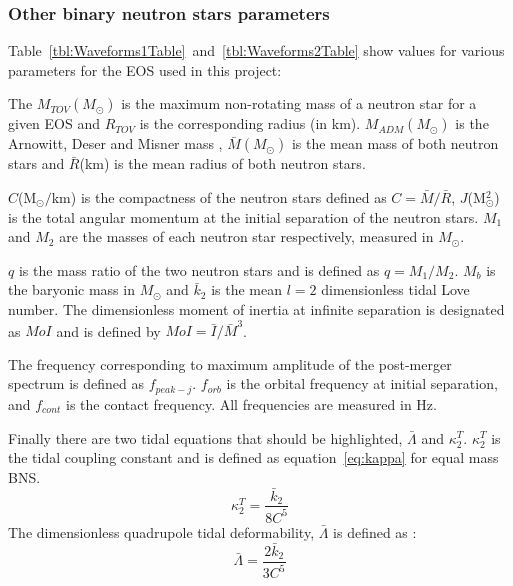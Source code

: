 \subsubsection{Other binary neutron stars parameters}
Table~\ref{tbl:Waveforms1Table}~and~\ref{tbl:Waveforms2Table} show values for various parameters for the EOS used in this project:
\begin{table}[H]
	\centering
	\resizebox{0.91\textwidth}{!}{%
		 }%
	\caption[\protect]{\protect}
	\label{tbl:Waveforms1Table}
\end{table}
\begin{table}[H]
	\centering	
	\resizebox{\textwidth}{!}{%
		 }%
	\caption[\protect]{\protect}
	\label{tbl:Waveforms2Table}
\end{table}
The $M_{TOV}(M_\odot)$ is the maximum non-rotating mass of a neutron star for a given EOS and $R_{TOV}$ is the corresponding radius (in km). $M_{ADM}(M_\odot)$ is the Arnowitt, Deser and Misner mass \citep{Arnowitt1959}, $\bar{M}(M_\odot)$ is the mean mass of both neutron stars and $\bar{R}$(km) is the mean radius of both neutron stars.\par 
$C$(M$_\odot/$km) is the compactness of the neutron stars defined as $C=\bar{M}/\bar{R}$, $J$(M$_\odot^2$) is the total angular momentum at the initial separation of the neutron stars. $M_1$ and $M_2$ are the masses of each neutron star respectively, measured in $M_\odot$. \par
$q$ is the mass ratio of the two neutron stars and is defined as $q=M_1/M_2$. $M_b$ is the baryonic mass in $M_\odot$ and  $\bar{k}_2$ is the mean $l=2$  dimensionless tidal Love number. The dimensionless moment of inertia at infinite separation is designated as $MoI$ and is defined by $MoI=\bar{I}/\bar{M}^3$.\par
The frequency corresponding to maximum amplitude of the post-merger spectrum is defined as $f_{peak-j}$. $f_{orb}$ is the orbital frequency at initial separation, and $f_{cont}$ is the contact frequency. All frequencies are measured in Hz.

Finally there are two tidal equations that should be highlighted, $\bar{\Lambda}$ and $\kappa^T_2$. $\kappa^T_2$ is the tidal coupling constant and is defined as equation~\ref{eq:kappa} \citep{Bernuzzi2015} for equal mass BNS.
\begin{equation}
\kappa_2^T=\dfrac{\bar{k}_2}{8C^5}
\label{eq:kappa}
\end{equation}	
The dimensionless quadrupole tidal deformability, $\bar{\Lambda}$ is defined as \citep{Read2013}:
\begin{equation}
\bar{\Lambda}=\dfrac{2\bar{k}_2}{3C^5}
\label{eq:Lambda}
\end{equation}	


